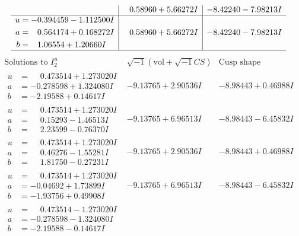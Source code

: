 \documentclass[1p]{elsarticle_modified}
\theoremstyle{definition}
\newcommand{\I}{\sqrt{-1}}
\begin{document}
$$\begin{array}{c|c|c}
 & \phantom{-}0.58960 + 5.66272 I & -8.42240 - 7.98213 I \\ \hline\begin{aligned}
u &= -0.394459 - 1.112500 I \\
a &= \phantom{-}0.564174 + 0.168272 I \\
b &= \phantom{-}1.06554 + 1.20660 I\end{aligned}
 & \phantom{-}0.58960 + 5.66272 I & -8.42240 - 7.98213 I\\
 \hline 
 \end{array}$$\newpage$$\begin{array}{c|c|c}  
\text{Solutions to }I^u_{2}& \I (\text{vol} + \sqrt{-1}CS) & \text{Cusp shape}\\
 \hline 
\begin{aligned}
u &= \phantom{-}0.473514 + 1.273020 I \\
a &= -0.278598 + 1.324080 I \\
b &= -2.19588 + 0.14617 I\end{aligned}
 & -9.13765 + 2.90536 I & -8.98443 + 0.46988 I \\ \hline\begin{aligned}
u &= \phantom{-}0.473514 + 1.273020 I \\
a &= \phantom{-}0.15293 - 1.46513 I \\
b &= \phantom{-}2.23599 - 0.76370 I\end{aligned}
 & -9.13765 + 6.96513 I & -8.98443 - 6.45832 I \\ \hline\begin{aligned}
u &= \phantom{-}0.473514 + 1.273020 I \\
a &= \phantom{-}0.46276 - 1.55281 I \\
b &= \phantom{-}1.81750 - 0.27231 I\end{aligned}
 & -9.13765 + 2.90536 I & -8.98443 + 0.46988 I \\ \hline\begin{aligned}
u &= \phantom{-}0.473514 + 1.273020 I \\
a &= -0.04692 + 1.73899 I \\
b &= -1.93756 + 0.49908 I\end{aligned}
 & -9.13765 + 6.96513 I & -8.98443 - 6.45832 I \\ \hline\begin{aligned}
u &= \phantom{-}0.473514 - 1.273020 I \\
a &= -0.278598 - 1.324080 I \\
b &= -2.19588 - 0.14617 I\end{aligned}

\end{array}$$
\end{document}
